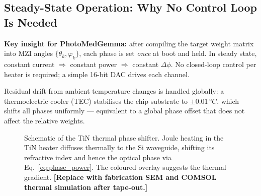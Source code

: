 \documentclass[12pt, a4paper]{article}
\begin{document}
\subsection{Steady-State Operation: Why No Control Loop Is Needed}

\textbf{Key insight for PhotoMedGemma:}
after compiling the target weight matrix into MZI angles
$\{\theta_k, \varphi_k\}$, each phase is set \emph{once} at boot and held.
In steady state, constant current $\Rightarrow$ constant power $\Rightarrow$
constant $\Delta\phi$.
No closed-loop control per heater is required;
a simple 16-bit DAC drives each channel.

Residual drift from ambient temperature changes is handled globally: a
thermoelectric cooler (TEC) stabilises the chip substrate to $\pm 0.01\,°C$,
which shifts all phases uniformly — equivalent to a global phase offset that
does not affect the relative weights.

\begin{figure}[H]
\centering
{}
\caption{%
  Schematic of the TiN thermal phase shifter.
  Joule heating in the TiN heater diffuses thermally to the Si waveguide,
  shifting its refractive index and hence the optical phase via
  Eq.~\eqref{eq:phase_power}.
  The coloured overlay suggests the thermal gradient.
  \textbf{[Replace with fabrication SEM and COMSOL thermal simulation after tape-out.]}%
}
\label{fig:phase_shifter}
\end{figure}
\end{document}
